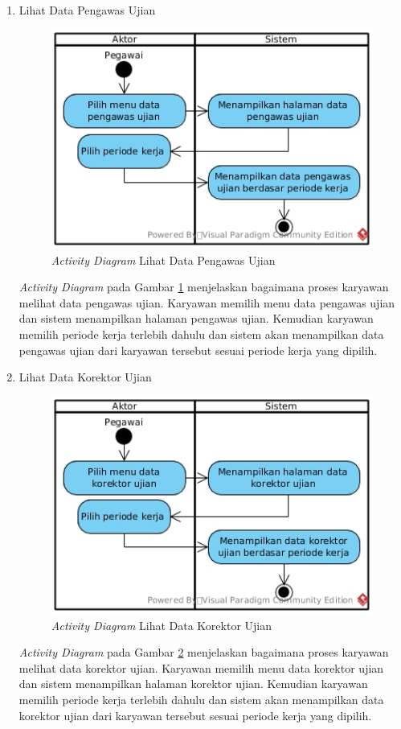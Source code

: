 \begin{enumerate}
\begin{enumerate}[label=\alph*.]
            		\item Lihat Data Pengawas Ujian
            	    \begin{figure}[H]
            		    \centering            		    \includegraphics[width=11cm]{gambar/activity/lihat-data-pengawas-ujian}
            		    \caption{\emph{Activity Diagram} Lihat Data Pengawas Ujian}
            		    \label{activity_lihat_pengawas}
            		\end{figure}
            		\emph{Activity Diagram} pada Gambar \ref{activity_lihat_pengawas} menjelaskan bagaimana proses karyawan melihat data pengawas ujian. Karyawan memilih menu data pengawas ujian dan sistem menampilkan halaman pengawas ujian. Kemudian karyawan memilih periode kerja terlebih dahulu dan sistem akan menampilkan data pengawas ujian dari karyawan tersebut sesuai periode kerja yang dipilih.\newpage
            		\item Lihat Data Korektor Ujian
            	    \begin{figure}[H]
            		    \centering            		    \includegraphics[width=11cm]{gambar/activity/lihat-data-korektor-ujian}
            		    \caption{\emph{Activity Diagram} Lihat Data Korektor Ujian}
            		    \label{activity_lihat_korektor}
            		\end{figure}
            		\emph{Activity Diagram} pada Gambar \ref{activity_lihat_korektor} menjelaskan bagaimana proses karyawan melihat data korektor ujian. Karyawan memilih menu data korektor ujian dan sistem menampilkan halaman korektor ujian. Kemudian karyawan memilih periode kerja terlebih dahulu dan sistem akan menampilkan data korektor ujian dari karyawan tersebut sesuai periode kerja yang dipilih.
            	\end{enumerate}
            	

\end{enumerate}
